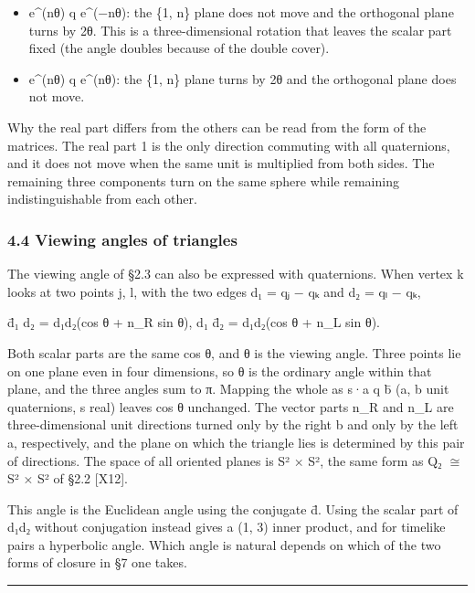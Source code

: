 \documentclass[
  a4paper,
]{article}
\providecommand{\tightlist}{%
  \setlength{\itemsep}{0pt}\setlength{\parskip}{0pt}}
\begin{document}
\begin{itemize}
\tightlist
\item
  e\^{}(nθ) q e\^{}(−nθ): the \{1, n\} plane does not move and the
  orthogonal plane turns by 2θ. This is a three-dimensional rotation
  that leaves the scalar part fixed (the angle doubles because of the
  double cover).
\item
  e\^{}(nθ) q e\^{}(nθ): the \{1, n\} plane turns by 2θ and the
  orthogonal plane does not move.
\end{itemize}

Why the real part differs from the others can be read from the form of
the matrices. The real part 1 is the only direction commuting with all
quaternions, and it does not move when the same unit is multiplied from
both sides. The remaining three components turn on the same sphere while
remaining indistinguishable from each other.

\subsubsection{4.4 Viewing angles of
triangles}\label{viewing-angles-of-triangles}

The viewing angle of §2.3 can also be expressed with quaternions. When
vertex k looks at two points j, l, with the two edges d₁ = qⱼ − qₖ and
d₂ = qₗ − qₖ,

d̄₁ d₂ = \textbar d₁\textbar\textbar d₂\textbar(cos θ + n\_R sin θ), d₁
d̄₂ = \textbar d₁\textbar\textbar d₂\textbar(cos θ + n\_L sin θ).

Both scalar parts are the same cos θ, and θ is the viewing angle. Three
points lie on one plane even in four dimensions, so θ is the ordinary
angle within that plane, and the three angles sum to π. Mapping the
whole as s·a q b̄ (a, b unit quaternions, s real) leaves cos θ unchanged.
The vector parts n\_R and n\_L are three-dimensional unit directions
turned only by the right b and only by the left a, respectively, and the
plane on which the triangle lies is determined by this pair of
directions. The space of all oriented planes is S² × S², the same form
as Q₂ \(\cong\) S² × S² of §2.2 {[}X12{]}.

This angle is the Euclidean angle using the conjugate d̄. Using the
scalar part of d₁d₂ without conjugation instead gives a (1, 3) inner
product, and for timelike pairs a hyperbolic angle. Which angle is
natural depends on which of the two forms of closure in §7 one takes.

\begin{center}\rule{0.5\linewidth}{0.5pt}\end{center}
\end{document}
